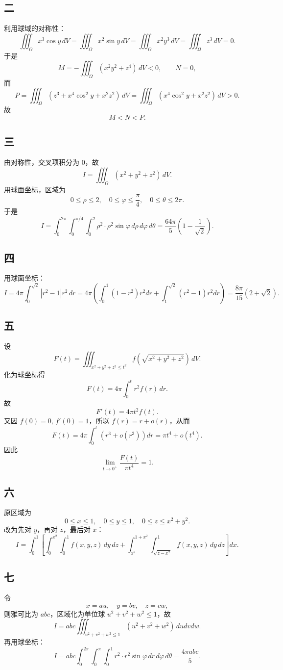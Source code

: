 \documentclass[12pt,a4paper]{ctexart}
\begin{document}
\subsection*{二}
利用球域的对称性：
\[
\iiint_{\Omega}x^3\cos y\,dV=\iiint_{\Omega}x^2\sin y\,dV=\iiint_{\Omega}x^2y^3\,dV=\iiint_{\Omega}z^3\,dV=0.
\]
于是
\[
M=-\iiint_{\Omega}(x^2y^2+z^4)\,dV<0,\qquad N=0,
\]
而
\[
P=\iiint_{\Omega}(z^3+x^4\cos^2 y+x^2z^2)\,dV
=\iiint_{\Omega}(x^4\cos^2 y+x^2z^2)\,dV>0.
\]
故
\[
M<N<P.
\]

\subsection*{三}
由对称性，交叉项积分为 $0$，故
\[
I=\iiint_{\Omega}(x^2+y^2+z^2)\,dV.
\]
用球面坐标，区域为
\[
0\le \rho\le 2,\quad 0\le \varphi\le \frac{\pi}{4},\quad 0\le \theta\le 2\pi.
\]
于是
\[
I=\int_0^{2\pi}\int_0^{\pi/4}\int_0^2 \rho^2\cdot \rho^2\sin\varphi\,d\rho\,d\varphi\,d\theta
=\frac{64\pi}{5}\left(1-\frac{1}{\sqrt2}\right).
\]

\subsection*{四}
用球面坐标：
\[
I=4\pi\int_0^{\sqrt2}|r^2-1|r^2\,dr
=4\pi\left(\int_0^1(1-r^2)r^2dr+\int_1^{\sqrt2}(r^2-1)r^2dr\right)
=\frac{8\pi}{15}(2+\sqrt2).
\]

\subsection*{五}
设
\[
F(t)=\iiint_{x^2+y^2+z^2\le t^2} f(\sqrt{x^2+y^2+z^2})\,dV.
\]
化为球坐标得
\[
F(t)=4\pi\int_0^t r^2f(r)\,dr.
\]
故
\[
F'(t)=4\pi t^2f(t).
\]
又因 $f(0)=0,\,f'(0)=1$，所以 $f(r)=r+o(r)$，从而
\[
F(t)=4\pi\int_0^t(r^3+o(r^3))dr=\pi t^4+o(t^4).
\]
因此
\[
\lim_{t\to 0^+}\frac{F(t)}{\pi t^4}=1.
\]

\subsection*{六}
原区域为
\[
0\le x\le 1,\quad 0\le y\le 1,\quad 0\le z\le x^2+y^2.
\]
改为先对 $y$，再对 $z$，最后对 $x$：
\[
I=\int_0^1\left[\int_0^{x^2}\int_0^1 f(x,y,z)\,dy\,dz
+\int_{x^2}^{1+x^2}\int_{\sqrt{z-x^2}}^1 f(x,y,z)\,dy\,dz\right]dx.
\]

\subsection*{七}
令
\[
x=au,\quad y=bv,\quad z=cw,
\]
则雅可比为 $abc$，区域化为单位球 $u^2+v^2+w^2\le 1$，故
\[
I=abc\iiint_{u^2+v^2+w^2\le 1}(u^2+v^2+w^2)\,dudvdw.
\]
再用球坐标：
\[
I=abc\int_0^{2\pi}\int_0^{\pi}\int_0^1 r^2\cdot r^2\sin\varphi\,dr\,d\varphi\,d\theta
=\frac{4\pi abc}{5}.
\]
\end{document}
